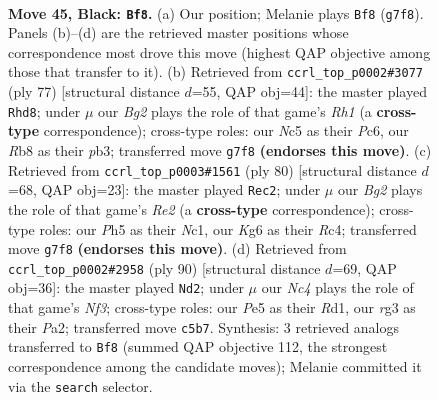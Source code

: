 \documentclass[11pt]{article}
\begin{document}
\clearpage

\begin{figure}[p]\centering
\begin{subfigure}{0.46\textwidth}\centering
\resizebox{\linewidth}{!}{%
\newchessgame
\chessboard[
  setfen={1rr5/6bp/p2p2k1/P1n1p1Pp/1pP1P3/1P3PR1/1K4B1/R3B3 b - - 5 45},
  showmover=false,
  pgfstyle=straightmove, color=movearrow, markmove={g7-f8}
]}
\caption{}
\end{subfigure}\hfill
\begin{subfigure}{0.46\textwidth}\centering
\resizebox{\linewidth}{!}{%
\newchessgame
\chessboard[
  setfen={2r4r/1p6/p1p2nk1/3Pp1p1/4P1Pp/1PP1R2P/5K2/3R1B2 b - - 2 39},
  showmover=false,
  pgfstyle=straightmove, color=movearrow, markmove={h8-d8}
]}
\caption{}
\end{subfigure}
\\[4pt]
\begin{subfigure}{0.46\textwidth}\centering
\resizebox{\linewidth}{!}{%
\newchessgame
\chessboard[
  setfen={8/1r2bpk1/4r1p1/p3p3/2RpP2p/P6P/1P2RPP1/2N2K2 w - - 7 41},
  showmover=false,
  pgfstyle=straightmove, color=movearrow, markmove={e2-c2}
]}
\caption{}
\end{subfigure}\hfill
\begin{subfigure}{0.46\textwidth}\centering
\resizebox{\linewidth}{!}{%
\newchessgame
\chessboard[
  setfen={r7/4b3/1n2ppk1/1rp3p1/p3P2p/2B2N1P/PPR2PP1/3R1K2 w - - 27 46},
  showmover=false,
  pgfstyle=straightmove, color=movearrow, markmove={f3-d2}
]}
\caption{}
\end{subfigure}
\caption{\textbf{Move 45, Black: \texttt{Bf8}.} (a) Our position; Melanie plays \texttt{Bf8} (\texttt{g7f8}). Panels (b)--(d) are the retrieved master positions whose correspondence most drove this move (highest QAP objective among those that transfer to it). (b) Retrieved from \texttt{ccrl\_top\_p0002\#3077} (ply 77) [structural distance $d$=55, QAP obj=44]: the master played \texttt{Rhd8}; under $\mu$ our \emph{Bg2} plays the role of that game's \emph{Rh1} (a \textbf{cross-type} correspondence); cross-type roles: our \emph{N}c5 as their \emph{P}c6, our \emph{R}b8 as their \emph{p}b3; transferred move \texttt{g7f8} \textbf{(endorses this move)}. (c) Retrieved from \texttt{ccrl\_top\_p0003\#1561} (ply 80) [structural distance $d$=68, QAP obj=23]: the master played \texttt{Rec2}; under $\mu$ our \emph{Bg2} plays the role of that game's \emph{Re2} (a \textbf{cross-type} correspondence); cross-type roles: our \emph{P}h5 as their \emph{N}c1, our \emph{K}g6 as their \emph{R}c4; transferred move \texttt{g7f8} \textbf{(endorses this move)}. (d) Retrieved from \texttt{ccrl\_top\_p0002\#2958} (ply 90) [structural distance $d$=69, QAP obj=36]: the master played \texttt{Nd2}; under $\mu$ our \emph{Nc4} plays the role of that game's \emph{Nf3}; cross-type roles: our \emph{P}e5 as their \emph{R}d1, our \emph{r}g3 as their \emph{P}a2; transferred move \texttt{c5b7}. Synthesis: 3 retrieved analogs transferred to \texttt{Bf8} (summed QAP objective 112, the strongest correspondence among the candidate moves); Melanie committed it via the \texttt{search} selector.}
\label{fig:thought-m89}
\end{figure}
\end{document}
